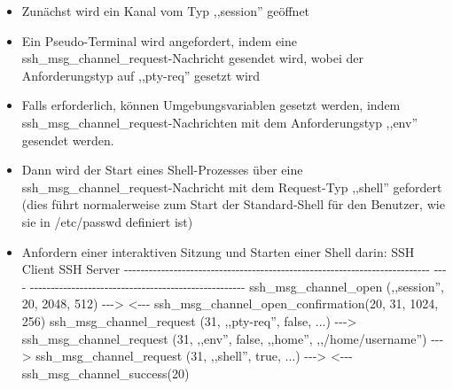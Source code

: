 \documentclass[a4paper]{article}
\begin{document}
\begin{multicols}{3}
\begin{itemize}
              \begin{itemize}
                  \item
                        Zunächst wird ein Kanal vom Typ ,,session'' geöffnet
                  \item
                        Ein Pseudo-Terminal wird angefordert, indem eine
                        ssh\_msg\_channel\_request-Nachricht gesendet wird, wobei der
                        Anforderungstyp auf ,,pty-req'' gesetzt wird
                  \item
                        Falls erforderlich, können Umgebungsvariablen gesetzt werden, indem
                        ssh\_msg\_channel\_request-Nachrichten mit dem Anforderungstyp
                        ,,env'' gesendet werden.
                  \item
                        Dann wird der Start eines Shell-Prozesses über eine
                        ssh\_msg\_channel\_request-Nachricht mit dem Request-Typ ,,shell''
                        gefordert (dies führt normalerweise zum Start der Standard-Shell für
                        den Benutzer, wie sie in /etc/passwd definiert ist)
                  \item
                        Anfordern einer interaktiven Sitzung und Starten einer Shell darin:
                        \textbar{} SSH Client \textbar{} \textbar{} SSH Server \textbar{}
                        \textbar{}
                        -\/-\/-\/-\/-\/-\/-\/-\/-\/-\/-\/-\/-\/-\/-\/-\/-\/-\/-\/-\/-\/-\/-\/-\/-\/-\/-\/-\/-\/-\/-\/-\/-\/-\/-\/-\/-\/-\/-\/-\/-\/-\/-\/-\/-\/-\/-\/-\/-\/-\/-\/-\/-\/-\/-\/-\/-\/-\/-\/-\/-\/-\/-\/-\/-\/-\/-\/-\/-\/-\/-\/-\/-\/-
                        \textbar{} -\/-\/-\/- \textbar{}
                        -\/-\/-\/-\/-\/-\/-\/-\/-\/-\/-\/-\/-\/-\/-\/-\/-\/-\/-\/-\/-\/-\/-\/-\/-\/-\/-\/-\/-\/-\/-\/-\/-\/-\/-\/-\/-\/-\/-\/-\/-\/-\/-\/-\/-\/-\/-\/-\/-\/-\/-\/-
                        \textbar{} \textbar{} ssh\_msg\_channel\_open (,,session'', 20,
                        2048, 512) \textbar{} -\/-\/-\textgreater{} \textbar{} \textbar{}
                        \textbar{} \textless-\/-\/- \textbar{}
                        ssh\_msg\_channel\_open\_confirmation(20, 31, 1024, 256) \textbar{}
                        \textbar{} ssh\_msg\_channel\_request (31, ,,pty-req'', false, ...)
                        \textbar{} -\/-\/-\textgreater{} \textbar{} \textbar{}
                        ssh\_msg\_channel\_request (31, ,,env'', false, ,,home'',
                        ,,/home/username'') \textbar{} -\/-\/-\textgreater{} \textbar{}
                        \textbar{} ssh\_msg\_channel\_request (31, ,,shell'', true, ...)
                        \textbar{} -\/-\/-\textgreater{} \textbar{} \textbar{} \textbar{}
                        \textless-\/-\/- \textbar{} ssh\_msg\_channel\_success(20)
                        \textbar{}


\end{itemize}
\end{itemize}
\end{multicols}
\end{document}
